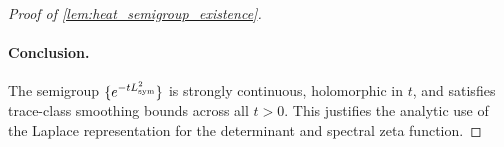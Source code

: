 \begin{proof}[Proof of \cref{lem:heat_semigroup_existence}]
\paragraph{Conclusion.}
The semigroup \( \{ e^{-t L_{\mathrm{sym}}^2} \} \) is strongly continuous, holomorphic in \( t \), and satisfies trace-class smoothing bounds across all \( t > 0 \). This justifies the analytic use of the Laplace representation for the determinant and spectral zeta function.
\end{proof}
